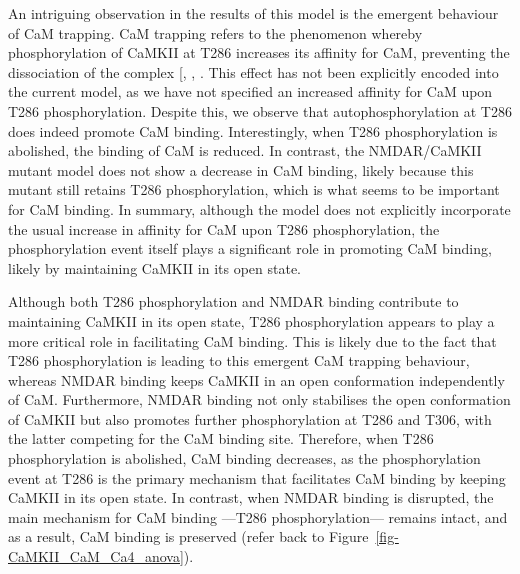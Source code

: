 \documentclass[
  11pt,
  letterpaper,
]{scrreprt}
\begin{document}
An intriguing observation in the results of this model is the emergent
behaviour of CaM trapping. CaM trapping refers to the phenomenon whereby
phosphorylation of CaMKII at T286 increases its affinity for CaM,
preventing the dissociation of the complex
{[},
,
\citeproc{ref-goodell2017DAPK1}{222}{]}. This effect has not been
explicitly encoded into the current model, as we have not specified an
increased affinity for CaM upon T286 phosphorylation. Despite this, we
observe that autophosphorylation at T286 does indeed promote CaM
binding. Interestingly, when T286 phosphorylation is abolished, the
binding of CaM is reduced. In contrast, the NMDAR/CaMKII mutant model
does not show a decrease in CaM binding, likely because this mutant
still retains T286 phosphorylation, which is what seems to be important
for CaM binding. In summary, although the model does not explicitly
incorporate the usual increase in affinity for CaM upon T286
phosphorylation, the phosphorylation event itself plays a significant
role in promoting CaM binding, likely by maintaining CaMKII in its open
state.

Although both T286 phosphorylation and NMDAR binding contribute to
maintaining CaMKII in its open state, T286 phosphorylation appears to
play a more critical role in facilitating CaM binding. This is likely
due to the fact that T286 phosphorylation is leading to this emergent
CaM trapping behaviour, whereas NMDAR binding keeps CaMKII in an open
conformation independently of CaM. Furthermore, NMDAR binding not only
stabilises the open conformation of CaMKII but also promotes further
phosphorylation at T286 and T306, with the latter competing for the CaM
binding site. Therefore, when T286 phosphorylation is abolished, CaM
binding decreases, as the phosphorylation event at T286 is the primary
mechanism that facilitates CaM binding by keeping CaMKII in its open
state. In contrast, when NMDAR binding is disrupted, the main mechanism
for CaM binding ---T286 phosphorylation--- remains intact, and as a
result, CaM binding is preserved (refer back to
Figure~\ref{fig-CaMKII_CaM_Ca4_anova}).
\end{document}
